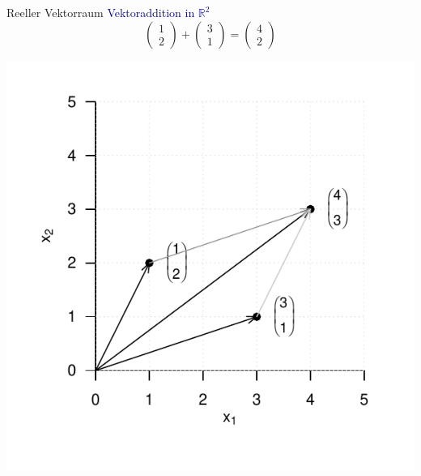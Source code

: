 \documentclass[
  8pt,
  ignorenonframetext,
]{beamer}
\begin{document}
\begin{frame}{Reeller Vektorraum}
\protect\hypertarget{reeller-vektorraum-6}{}
\textcolor{darkblue}{Vektoraddition in $\mathbb{R}^2$} \vspace{2mm}
\small \begin{equation}
\begin{pmatrix}
1 \\ 2
\end{pmatrix}
+
\begin{pmatrix}
3 \\ 1
\end{pmatrix}
=
\begin{pmatrix}
4 \\ 2
\end{pmatrix}
\end{equation} \vspace{-2mm}

\begin{center}\includegraphics[width=0.5\linewidth]{2_Abbildungen/mvda_2_vektoraddition_R2} \end{center}
\end{frame}
\end{document}
